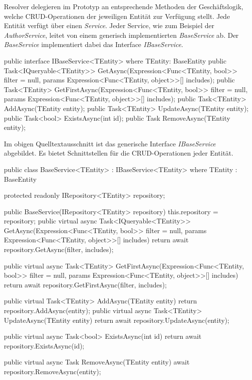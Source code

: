 Resolver delegieren im Prototyp an entsprechende Methoden der Geschäftslogik, welche CRUD-Operationen der jeweiligen Entität zur Verfügung stellt.
Jede Entität verfügt über einen \textit{Service}.
Jeder Service, wie zum Beispiel der \textit{AuthorService}, leitet von einem generisch implementierten \textit{BaseService} ab.
Der \textit{BaseService} implementiert dabei das Interface \textit{IBaseService}.
\newline

\begin{JsCode}
public interface IBaseService<TEntity> where TEntity: BaseEntity {
    public Task<IQueryable<TEntity>> GetAsync(Expression<Func<TEntity, bool>> filter = null, params Expression<Func<TEntity, object>>[] includes);
    public Task<TEntity> GetFirstAsync(Expression<Func<TEntity, bool>> filter = null, params Expression<Func<TEntity, object>>[] includes);
    public Task<TEntity> AddAsync(TEntity entity);
    public Task<TEntity> UpdateAsync(TEntity entity);
    public Task<bool> ExistsAsync(int id);
    public Task RemoveAsync(TEntity entity);
}
\end{JsCode}

Im obigen Quelltextausschnitt ist das generische Interface \textit{IBaseService} abgebildet.
Es bietet Schnittstellen für die CRUD-Operationen jeder Entität.

\begin{JsCode}
public class BaseService<TEntity> : IBaseService<TEntity> where TEntity : BaseEntity {
    protected readonly IRepository<TEntity> repository;

    public BaseService(IRepository<TEntity> repository) {
        this.repository = repository;
    }
    public virtual async Task<IQueryable<TEntity>> GetAsync(Expression<Func<TEntity, bool>> filter = null, params Expression<Func<TEntity, object>>[] includes) {
        return await repository.GetAsync(filter, includes);
    }

    public virtual async Task<TEntity> GetFirstAsync(Expression<Func<TEntity, bool>> filter = null, params Expression<Func<TEntity, object>>[] includes) {
        return await repository.GetFirstAsync(filter, includes);
    }

    public virtual Task<TEntity> AddAsync(TEntity entity) {
        return repository.AddAsync(entity);
    }
    public virtual async Task<TEntity> UpdateAsync(TEntity entity) {
        return await repository.UpdateAsync(entity);
    }

    public virtual async Task<bool> ExistsAsync(int id) {
        return await repository.ExistsAsync(id);
    }

    public virtual async Task RemoveAsync(TEntity entity) {
        await repository.RemoveAsync(entity);
    }
}
\end{JsCode}

